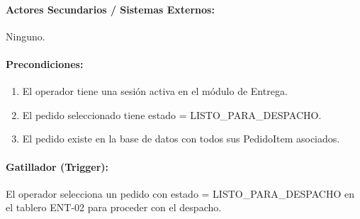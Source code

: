 \paragraph{Actores Secundarios / Sistemas Externos:} Ninguno.

\paragraph{Precondiciones:}
\begin{enumerate}
    \item[I.] El operador tiene una sesión activa en el módulo de Entrega.
    \item[II.] El pedido seleccionado tiene estado = LISTO\_PARA\_DESPACHO.
    \item[III.] El pedido existe en la base de datos con todos sus PedidoItem asociados.
\end{enumerate}

\paragraph{Gatillador (Trigger):} El operador selecciona un pedido con estado = LISTO\_PARA\_DESPACHO en el tablero ENT-02 para proceder con el despacho.

